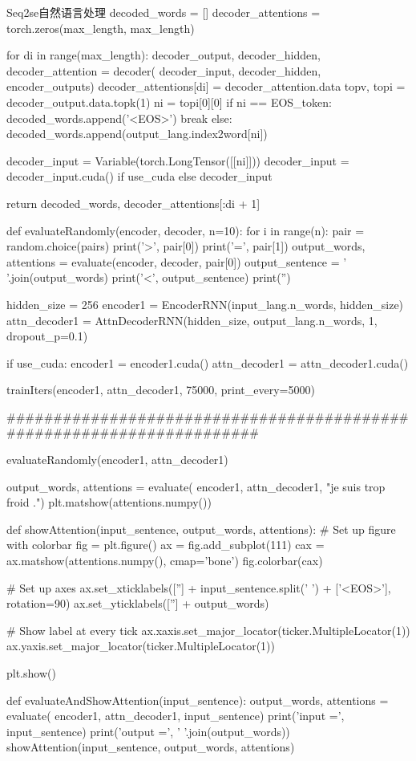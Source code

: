 \documentclass[openbib]{article}
\begin{document}
\begin{Python}{Seq2se自然语言处理}
	decoded_words = []
	decoder_attentions = torch.zeros(max_length, max_length)
	
	for di in range(max_length):
		decoder_output, decoder_hidden, decoder_attention = decoder(
				decoder_input, decoder_hidden, encoder_outputs)
		decoder_attentions[di] = decoder_attention.data
		topv, topi = decoder_output.data.topk(1)
		ni = topi[0][0]
		if ni == EOS_token:
			decoded_words.append('<EOS>')
			break
		else:
			decoded_words.append(output_lang.index2word[ni])
	
		decoder_input = Variable(torch.LongTensor([[ni]]))
		decoder_input = decoder_input.cuda() if use_cuda else decoder_input
	
	return decoded_words, decoder_attentions[:di + 1]

def evaluateRandomly(encoder, decoder, n=10):
	for i in range(n):
		pair = random.choice(pairs)
		print('>', pair[0])
		print('=', pair[1])
		output_words, attentions = evaluate(encoder, decoder, pair[0])
		output_sentence = ' '.join(output_words)
		print('<', output_sentence)
		print('')

hidden_size = 256
encoder1 = EncoderRNN(input_lang.n_words, hidden_size)
attn_decoder1 = AttnDecoderRNN(hidden_size, output_lang.n_words,
								1, dropout_p=0.1)

if use_cuda:
	encoder1 = encoder1.cuda()
	attn_decoder1 = attn_decoder1.cuda()

trainIters(encoder1, attn_decoder1, 75000, print_every=5000)

######################################################################

evaluateRandomly(encoder1, attn_decoder1)

output_words, attentions = evaluate(
	encoder1, attn_decoder1, "je suis trop froid .")
plt.matshow(attentions.numpy())

def showAttention(input_sentence, output_words, attentions):
# Set up figure with colorbar
	fig = plt.figure()
	ax = fig.add_subplot(111)
	cax = ax.matshow(attentions.numpy(), cmap='bone')
	fig.colorbar(cax)

# Set up axes
	ax.set_xticklabels([''] + input_sentence.split(' ') +
						['<EOS>'], rotation=90)
	ax.set_yticklabels([''] + output_words)

# Show label at every tick
	ax.xaxis.set_major_locator(ticker.MultipleLocator(1))
	ax.yaxis.set_major_locator(ticker.MultipleLocator(1))

	plt.show()

def evaluateAndShowAttention(input_sentence):
	output_words, attentions = evaluate(
	encoder1, attn_decoder1, input_sentence)
	print('input =', input_sentence)
	print('output =', ' '.join(output_words))
	showAttention(input_sentence, output_words, attentions)


\end{Python}
\end{document}
